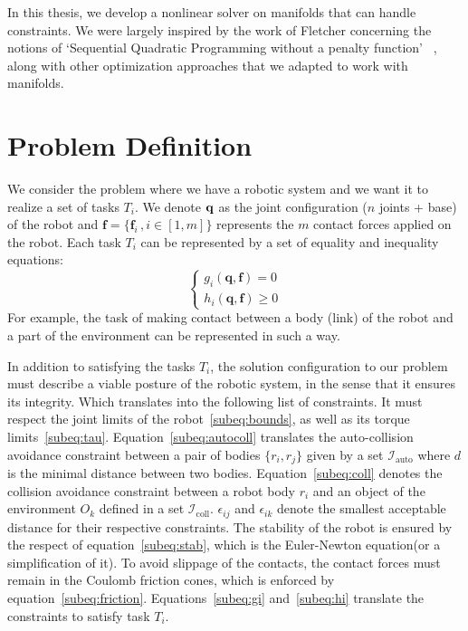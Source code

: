In this thesis, we develop a nonlinear solver on manifolds that can handle constraints.
We were largely inspired by the work of Fletcher concerning the notions of `Sequential Quadratic Programming without a penalty function' ~\cite{Fletcher:ifip:2006, fletcher2010sequential, fletcher:mathprog:2000}, along with other optimization approaches that we adapted to work with manifolds.

\section{Problem Definition}
\label{sec:problem_definition}


We consider the problem where we have a robotic system and we want it to realize a set of tasks $T_i$.
We denote $\bf q$ as the joint configuration ($n$ joints + base) of the robot and $\mathbf{f} =\{\mathbf{f}_i\,, i\in[1,m]\}$ represents the $m$ contact forces applied on the robot.
Each task $T_i$ can be represented by a set of equality and inequality equations:
\begin{equation}
  \left\{
    \begin{aligned}
    g_i(\mathbf{q},\mathbf{f}) = 0\\
    h_i(\mathbf{q},\mathbf{f}) \geq 0
    \end{aligned}
  \right.
\end{equation}
For example, the task of making contact between a body (link) of the robot and a part of the environment can be represented in such a way.

In addition to satisfying the tasks $T_i$, the solution configuration to our problem must describe a viable posture of the robotic system, in the sense that it ensures its integrity.
Which translates into the following list of constraints.
It must respect the joint limits of the robot~\eqref{subeq:bounds}, as well as its torque limits~\eqref{subeq:tau}.
Equation~\eqref{subeq:autocoll} translates the auto-collision avoidance constraint between a pair of bodies $\{r_i, r_j\}$ given by a set $\mathcal{I}_\text{auto}$ where $d$ is the minimal distance between two bodies.
Equation~\eqref{subeq:coll} denotes the collision avoidance constraint between a robot body $r_i$ and an object of the environment $O_k$ defined in a set $\mathcal{I}_\text{coll}$.
$\epsilon_{ij}$ and $\epsilon_{ik}$ denote the smallest acceptable distance for their respective constraints.
The stability of the robot is ensured by the respect of equation~\eqref{subeq:stab}, which is the Euler-Newton equation(or a simplification of it).
To avoid slippage of the contacts, the contact forces must remain in the Coulomb friction cones, which is enforced by equation~\eqref{subeq:friction}.
Equations~\eqref{subeq:gi} and~\eqref{subeq:hi} translate the constraints to satisfy task $T_i$.

